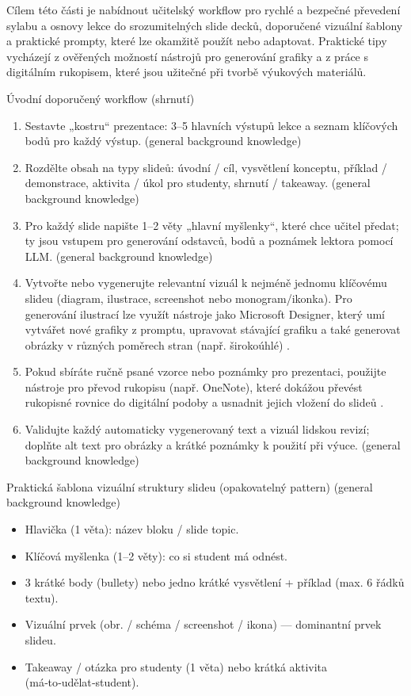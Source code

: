
Cílem této části je nabídnout učitelský workflow pro rychlé a bezpečné převedení sylabu a osnovy lekce do srozumitelných slide decků, doporučené vizuální šablony a praktické prompty, které lze okamžitě použít nebo adaptovat. Praktické tipy vycházejí z ověřených možností nástrojů pro generování grafiky a z práce s digitálním rukopisem, které jsou užitečné při tvorbě výukových materiálů.

Úvodní doporučený workflow (shrnutí)
\begin{enumerate}
  \item Sestavte „kostru“ prezentace: 3--5 hlavních výstupů lekce a seznam klíčových bodů pro každý výstup.  (general background knowledge)
  \item Rozdělte obsah na typy slideů: úvodní / cíl, vysvětlení konceptu, příklad / demonstrace, aktivita / úkol pro studenty, shrnutí / takeaway. (general background knowledge)
  \item Pro každý slide napište 1--2 věty „hlavní myšlenky“, které chce učitel předat; ty jsou vstupem pro generování odstavců, bodů a poznámek lektora pomocí LLM. (general background knowledge)
  \item Vytvořte nebo vygenerujte relevantní vizuál k nejméně jednomu klíčovému slideu (diagram, ilustrace, screenshot nebo monogram/ikonka). Pro generování ilustrací lze využít nástroje jako Microsoft Designer, který umí vytvářet nové grafiky z promptu, upravovat stávající grafiku a také generovat obrázky v různých poměrech stran (např. širokoúhlé) \cite{kb_ai_101_tipu_pdf_04e4a115_page_51_1}.
  \item Pokud sbíráte ručně psané vzorce nebo poznámky pro prezentaci, použijte nástroje pro převod rukopisu (např. OneNote), které dokážou převést rukopisné rovnice do digitální podoby a usnadnit jejich vložení do slideů \cite{kb_ai_101_tipu_pdf_04e4a115_page_8_1}.
  \item Validujte každý automaticky vygenerovaný text a vizuál lidskou revizí; doplňte alt text pro obrázky a krátké poznámky k použití při výuce. (general background knowledge)
\end{enumerate}

Praktická šablona vizuální struktury slideu (opakovatelný pattern)  (general background knowledge)
\begin{itemize}
  \item Hlavička (1 věta): název bloku / slide topic.
  \item Klíčová myšlenka (1--2 věty): co si student má odnést.
  \item 3 krátké body (bullety) nebo jedno krátké vysvětlení + příklad (max. 6 řádků textu).
  \item Vizuální prvek (obr. / schéma / screenshot / ikona) — dominantní prvek slideu.
  \item Takeaway / otázka pro studenty (1 věta) nebo krátká aktivita (má‑to‑udělat‑student).
\end{itemize}

